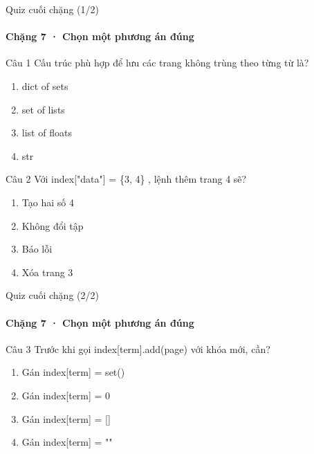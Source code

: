 \documentclass[aspectratio=169,10pt]{beamer}
\begin{document}
\begin{frame}[t]{Quiz cuối chặng (1/2)}
\framesubtitle{Chặng 7 · Chọn một phương án đúng}
\small
\begin{block}{Câu 1}
Cấu trúc phù hợp để lưu các trang không trùng theo từng từ là?\par\smallskip
\begin{enumerate}
\item dict of sets
\item set of lists
\item list of floats
\item str
\end{enumerate}
\end{block}
\begin{block}{Câu 2}
Với index["data"] = \{3, 4\} , lệnh thêm trang 4 sẽ?\par\smallskip
\begin{enumerate}
\item Tạo hai số 4
\item Không đổi tập
\item Báo lỗi
\item Xóa trang 3
\end{enumerate}
\end{block}

\end{frame}

\begin{frame}[t]{Quiz cuối chặng (2/2)}
\framesubtitle{Chặng 7 · Chọn một phương án đúng}
\small
\begin{block}{Câu 3}
Trước khi gọi index[term].add(page) với khóa mới, cần?\par\smallskip
\begin{enumerate}
\item Gán index[term] = set()
\item Gán index[term] = 0
\item Gán index[term] = []
\item Gán index[term] = ""
\end{enumerate}
\end{block}

\end{frame}
\end{document}
